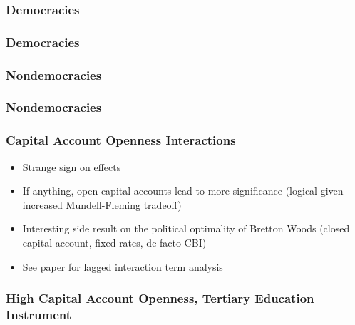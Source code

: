 \documentclass{beamer}
\begin{document}
    \begin{frame}
        \frametitle{Democracies}
        {
            \let\oldcentering\centering
            \renewcommand\centering{\tiny\oldcentering}
            
        }
    \end{frame}

    \begin{frame}
        \frametitle{Democracies}
        {
            \let\oldcentering\centering
            \renewcommand\centering{\tiny\oldcentering}
            
        }
    \end{frame}

    \begin{frame}
        \frametitle{Nondemocracies}
        {
            \let\oldcentering\centering
            \renewcommand\centering{\tiny\oldcentering}
            
        }
    \end{frame}

    \begin{frame}
        \frametitle{Nondemocracies}
        {
            \let\oldcentering\centering
            \renewcommand\centering{\tiny\oldcentering}
            
        }
    \end{frame}

    \begin{frame}
        \frametitle{Capital Account Openness Interactions}
        \begin{itemize}
            \item Strange sign on effects
            \item If anything, open capital accounts lead to more significance (logical given increased Mundell-Fleming tradeoff)
            \item Interesting side result on the political optimality of Bretton Woods (closed capital account, fixed rates, de facto CBI)
            \item See paper for lagged interaction term analysis
        \end{itemize}
    \end{frame}

    \begin{frame}
        \frametitle{High Capital Account Openness, Tertiary Education Instrument}
        {
            \let\oldcentering\centering
            \renewcommand\centering{\tiny\oldcentering}
            
        }
    \end{frame}
\end{document}
